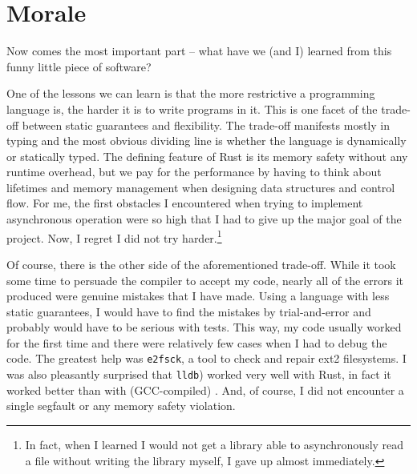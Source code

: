 \chapter{Morale}

Now comes the most important part -- what have we (and I) learned from this
funny little piece of software? 

One of the lessons we can learn is that the more restrictive a programming
language is, the harder it is to write programs in it. This is one facet of the
trade-off between static guarantees and flexibility. The trade-off manifests
mostly in typing and the most obvious dividing line is whether the language is
dynamically or statically typed. The defining feature of Rust is its memory
safety without any runtime overhead, but we pay for the performance by having to
think about lifetimes and memory management when designing data structures and
control flow. For me, the first obstacles I encountered when trying to implement
asynchronous operation were so high that I had to give up the major goal of the
project. Now, I regret I did not try harder.\footnote{In fact, when I learned I
would not get a library able to asynchronously read a file without writing the
library myself, I gave up almost immediately.}

Of course, there is the other side of the aforementioned trade-off. While it
took some time to persuade the compiler to accept my code, nearly all of the
errors it produced were genuine mistakes that I have made. Using a language with
less static guarantees, I would have to find the mistakes by trial-and-error and
probably would have to be serious with tests. This way, my code usually worked
for the first time and there were relatively few cases when I had to debug the
code. The greatest help was \texttt{e2fsck}, a tool to check and repair ext2
filesystems. I was also pleasantly surprised that \texttt{lldb}) worked very
well with Rust, in fact it worked better than with (GCC-compiled) \Cplusplus{}.
And, of course, I did not encounter a single segfault or any memory safety
violation.
